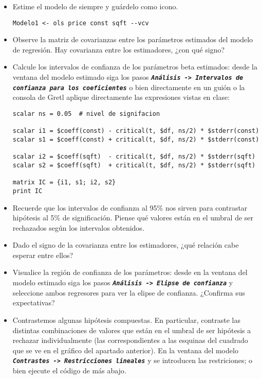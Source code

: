 \documentclass[11pt]{article}
\begin{document}
\begin{itemize}
\item Estime el modelo de siempre y guárdelo como icono.
\begin{verbatim}
Modelo1 <- ols price const sqft --vcv
\end{verbatim}

\item Observe la matriz de covarianzas entre los parámetros estimados del
modelo de regresión. Hay covarianza entre los estimadores, ¿con qué
signo?

\item Calcule los intervalos de confianza de los parámetros beta
estimados: desde la ventana del modelo estimado siga los pasos
\textbf{\emph{\texttt{Análisis -> Intervalos de confianza para los coeficientes}}} o
bien directamente en un guión o la consola de Gretl aplique
directamente las expresiones vistas en clase:
\begin{verbatim}
scalar ns = 0.05  # nivel de signifacion

scalar i1 = $coeff(const) - critical(t, $df, ns/2) * $stderr(const)
scalar s1 = $coeff(const) + critical(t, $df, ns/2) * $stderr(const)

scalar i2 = $coeff(sqft)  - critical(t, $df, ns/2) * $stderr(sqft)
scalar s2 = $coeff(sqft)  + critical(t, $df, ns/2) * $stderr(sqft)

matrix IC = {i1, s1; i2, s2}
print IC
\end{verbatim}

\item Recuerde que los intervalos de confianza al 95\% nos sirven para
contrastar hipótesis al 5\% de significación. Piense qué valores
están en el umbral de ser rechazados según los intervalos obtenidos.

\item Dado el signo de la covarianza entre los estimadores, ¿qué relación
cabe esperar entre ellos?

\item Visualice la región de confianza de los parámetros: desde en la
ventana del modelo estimado siga los pasos \textbf{\emph{\texttt{Análisis -> Elipse de
  confianza}}} y seleccione ambos regresores para ver la elipse de
confianza. ¿Confirma sus expectativas?

\item Contrastemos algunas hipótesis compuestas. En particular, contraste
las distintas combinaciones de valores que están en el umbral de ser
hipótesis a rechazar individualmente (las correspondientes a las
esquinas del cuadrado que se ve en el gráfico del apartado
anterior). En la ventana del modelo \textbf{\emph{\texttt{Contrastes -> Restricciones
  lineales}}} y se introducen las restriciones; o bien ejecute el
código de más abajo.


\end{itemize}
\end{document}

